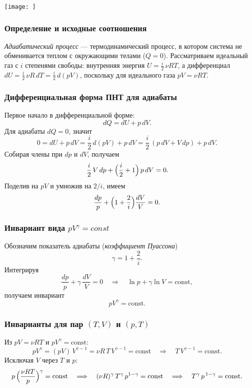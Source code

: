 \documentclass[12pt, a4paper]{article}%
\begin{document}
\begin{center}
\texttt{[image: ]}
\label{fig:mpr}
\end{center}



\subsubsection*{Определение и исходные соотношения}
\textit{Адиабатический процесс} — термодинамический процесс, в котором система не обменивается теплом с окружающими телами ($Q=0$). Рассматриваем идеальный газ с $i$ степенями свободы: внутренняя энергия $U=\tfrac{i}{2}\,\nu R T$, а дифференциал $dU=\tfrac{i}{2}\,\nu R\,dT=\tfrac{i}{2}\,d(pV)$, поскольку для идеального газа $pV=\nu R T$.

\subsubsection*{Дифференциальная форма ПНТ для адиабаты}
Первое начало в дифференциальной форме: 
\[
dQ=dU+p\,dV.
\]
Для адиабаты $dQ=0$, значит
\[
0=dU+p\,dV=\frac{i}{2}\,d(pV)+p\,dV=\frac{i}{2}\,(p\,dV+V\,dp)+p\,dV.
\]
Собирая члены при $dp$ и $dV$, получаем
\[
\,\frac{i}{2}\,V\,dp+\Bigl(\frac{i}{2}+1\Bigr)\,p\,dV=0.
\]
Поделив на $pV$ и умножив на $2/i$, имеем
\[
\frac{dp}{p}+\Bigl(1+\frac{2}{i}\Bigr)\frac{dV}{V}=0.
\]

\subsubsection*{Инвариант вида $pV^\gamma = const$}
Обозначим показатель адиабаты (\textit{коэффициент Пуассона})
\[
\gamma=1+\frac{2}{i}.
\]
Интегрируя
\[
\frac{dp}{p}+\gamma\,\frac{dV}{V}=0 \quad\Longrightarrow\quad \ln p+\gamma \ln V=\text{const},
\]
получаем инвариант
\[
pV^{\gamma}=\text{const}.
\]

\subsubsection*{Инварианты для пар \((T,V)\) и \((p,T)\)}
Из $pV=\nu R T$ и $pV^{\gamma}=\text{const}$:
\[
pV^{\gamma}=(pV)\,V^{\gamma-1}=\nu R\,T\,V^{\gamma-1}=\text{const}
\quad\Longrightarrow\quad
T\,V^{\gamma-1}=\text{const}.
\]
Исключая $V$ через $T$ и $p$:
\[
p\,\Bigl(\frac{\nu R T}{p}\Bigr)^{\gamma}=\text{const}
\quad\Longrightarrow\quad
(\nu R)^{\gamma}\,T^{\gamma}\,p^{1-\gamma}=\text{const}
\quad\Longrightarrow\quad
T^{\gamma}\,p^{\,1-\gamma}=\text{const}.
\]
\end{document}
